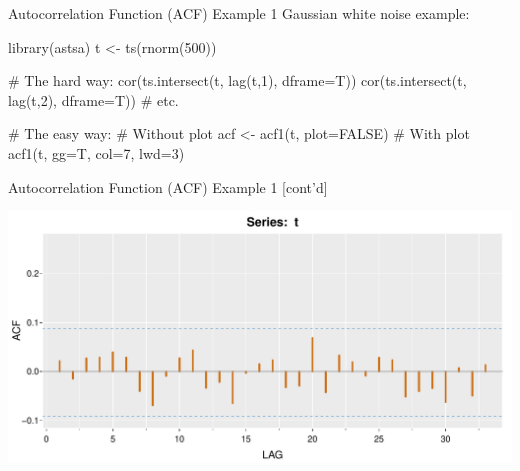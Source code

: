 \documentclass[ignorenonframetext,xcolor=x11names]{beamer}
\begin{document}



\begin{frame}[fragile]{Autocorrelation Function (ACF) Example 1}
Gaussian white noise example:
\begin{Rcode}
library(astsa)
t <- ts(rnorm(500))

# The hard way:
cor(ts.intersect(t, lag(t,1), dframe=T))
cor(ts.intersect(t, lag(t,2), dframe=T))
# etc.

# The easy way:
# Without plot
acf <- acf1(t, plot=FALSE)
# With plot
acf1(t, gg=T, col=7, lwd=3)
\end{Rcode}
\end{frame}

\begin{frame}{Autocorrelation Function (ACF) Example 1 \small [cont'd]}
\begin{center}
\includegraphics[width=\textwidth]{figure7a.pdf}
\end{center}
\end{frame}
\end{document}
